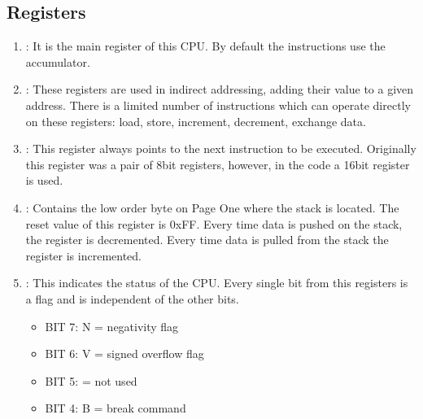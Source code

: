 \documentclass[letterpaper,10pt,english]{sphinxmanual}
\begin{document}
\subsection{Registers}
\label{\detokenize{core_6502:registers}}\begin{enumerate}
%
\item {} 
\sphinxAtStartPar
{}: It is the main register of this CPU. By default the
instructions use the accumulator.

\item {} 
\sphinxAtStartPar
{}: These registers are used in
indirect addressing, adding their value to a given address. There is a limited
number of instructions which can operate directly on these registers: load,
store, increment, decrement, exchange data.

\item {} 
\sphinxAtStartPar
{}: This register always points to the next instruction
to be executed. Originally this register was a pair of 8\sphinxhyphen{}bit registers,
however, in the code a 16\sphinxhyphen{}bit register is used.

\item {} 
\sphinxAtStartPar
{}: Contains the low order byte on Page One where the
stack is located. The reset value of this register is 0xFF. Every time data is
pushed on the stack, the register is decremented. Every time data is pulled from
the stack the register is incremented.

\item {} 
\sphinxAtStartPar
{}: This indicates the status of the CPU. Every
single bit from this registers is a flag and is independent of the other bits.
\begin{itemize}
\item {} 
\sphinxAtStartPar
BIT 7: N = negativity flag

\item {} 
\sphinxAtStartPar
BIT 6: V = signed overflow flag

\item {} 
\sphinxAtStartPar
BIT 5: \sphinxhyphen{} = not used

\item {} 
\sphinxAtStartPar
BIT 4: B = break command 


\end{itemize}
\end{enumerate}
\end{document}
